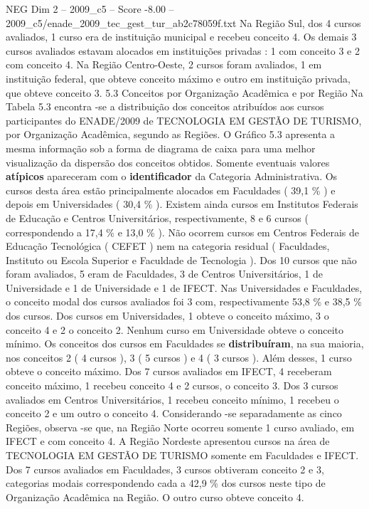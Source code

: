 \begin{textsample}{NEG Dim 2 – 2009\_c5 – Score -8.00 – 2009\_c5/enade\_2009\_tec\_gest\_tur\_ab2c78059f.txt}
Na Região Sul, dos 4 cursos avaliados, 1 curso era de instituição municipal e recebeu conceito 4.
Os demais 3 cursos avaliados estavam alocados em instituições privadas : 1 com conceito 3 e 2 com conceito 4.
Na Região Centro-Oeste, 2 cursos foram avaliados, 1 em instituição federal, que obteve conceito máximo e outro em instituição privada, que obteve conceito 3. 5.3 Conceitos por Organização Acadêmica e por Região Na Tabela 5.3 encontra -se a distribuição dos conceitos atribuídos aos cursos participantes do ENADE/2009 de TECNOLOGIA EM GESTÃO DE TURISMO, por Organização Acadêmica, segundo as Regiões.
O Gráfico 5.3 apresenta a mesma informação sob a forma de diagrama de caixa para uma melhor visualização da dispersão dos conceitos obtidos.
Somente eventuais valores \textbf{atípicos} apareceram com o \textbf{identificador} da Categoria Administrativa.
Os cursos desta área estão principalmente alocados em Faculdades ( 39,1 \% ) e depois em Universidades ( 30,4 \% ).
Existem ainda cursos em Institutos Federais de Educação e Centros Universitários, respectivamente, 8 e 6 cursos ( correspondendo a 17,4 \% e 13,0 \% ).
Não ocorrem cursos em Centros Federais de Educação Tecnológica ( CEFET ) nem na categoria residual ( Faculdades, Instituto ou Escola Superior e Faculdade de Tecnologia ).
Dos 10 cursos que não foram avaliados, 5 eram de Faculdades, 3 de Centros Universitários, 1 de Universidade e 1 de Universidade e 1 de IFECT.
Nas Universidades e Faculdades, o conceito modal dos cursos avaliados foi 3 com, respectivamente 53,8 \% e 38,5 \% dos cursos.
Dos cursos em Universidades, 1 obteve o conceito máximo, 3 o conceito 4 e 2 o conceito 2.
Nenhum curso em Universidade obteve o conceito mínimo.
Os conceitos dos cursos em Faculdades se \textbf{distribuíram}, na sua maioria, nos conceitos 2 ( 4 cursos ), 3 ( 5 cursos ) e 4 ( 3 cursos ).
Além desses, 1 curso obteve o conceito máximo.
Dos 7 cursos avaliados em IFECT, 4 receberam conceito máximo, 1 recebeu conceito 4 e 2 cursos, o conceito 3.
Dos 3 cursos avaliados em Centros Universitários, 1 recebeu conceito mínimo, 1 recebeu o conceito 2 e um outro o conceito 4.
Considerando -se separadamente as cinco Regiões, observa -se que, na Região Norte ocorreu somente 1 curso avaliado, em IFECT e com conceito 4.
A Região Nordeste apresentou cursos na área de TECNOLOGIA EM GESTÃO DE TURISMO somente em Faculdades e IFECT.
Dos 7 cursos avaliados em Faculdades, 3 cursos obtiveram conceito 2 e 3, categorias modais correspondendo cada a 42,9 \% dos cursos neste tipo de Organização Acadêmica na Região.
O outro curso obteve conceito 4.

\end{textsample}
